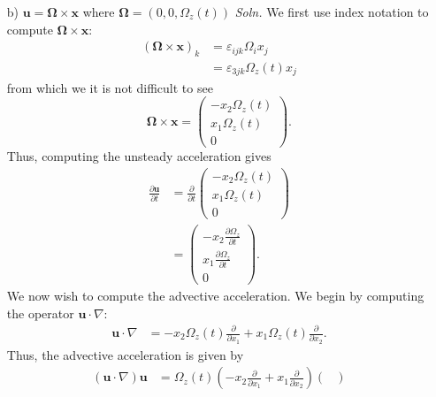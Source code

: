 \documentclass{article}
\begin{document}
\begin{itemize}
\begin{itemize}
        \item[b)] $\mathbf{u} = \mathbf{\Omega} \times \mathbf{x}$ where $\mathbf{\Omega} = (0,0,\Omega_{z}(t))$
        \newline\newline
        \textit{Soln.} We first use index notation to compute $\mathbf{\Omega}\times \mathbf{x}$:
        \begin{align*}
            (\mathbf{\Omega}\times\mathbf{x})_k &= \varepsilon_{ijk}\Omega_ix_j\\
            &= \varepsilon_{3jk}\Omega_z(t)x_j
        \end{align*}
        from which we it is not difficult to see
        \[\mathbf{\Omega}\times \mathbf{x} = \begin{pmatrix}
            -x_2\Omega_z(t)\\
            x_1\Omega_z(t)\\
            0
        \end{pmatrix}.\]
        Thus, computing the unsteady acceleration gives
        \begin{align*}
            \frac{\partial \mathbf{u}}{\partial t} &= \frac{\partial}{\partial t}\begin{pmatrix}
                -x_2\Omega_z(t)\\
                x_1\Omega_z(t)\\
                0
            \end{pmatrix}\\
            &= \begin{pmatrix}
                -x_2\frac{\partial\Omega_z}{\partial t}\\
                x_1\frac{\partial \Omega_z}{\partial t}\\
                0
            \end{pmatrix}.
        \end{align*}
        We now wish to compute the advective acceleration. We begin by computing the operator $\mathbf{u}\cdot \nabla$:
        \begin{align*}
            \mathbf{u}\cdot\nabla &= -x_2\Omega_z(t)\frac{\partial }{\partial x_1} + x_1\Omega_z(t)\frac{\partial }{\partial x_2}.
        \end{align*}
        Thus, the advective acceleration is given by
        \begin{align*}
            (\mathbf{u}\cdot \nabla)\mathbf{u} &= \Omega_z(t)\left(-x_2\frac{\partial }{\partial x_1} + x_1\frac{\partial }{\partial x_2}\right)\begin{pmatrix}

\end{pmatrix}
\end{align*}
\end{itemize}
\end{itemize}
\end{document}
